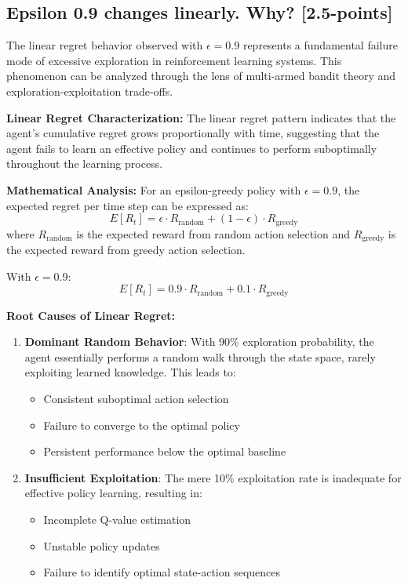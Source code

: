 \documentclass[12pt]{article}
\begin{document}
{{{\subsection{Epsilon 0.9 changes linearly. Why? [2.5-points]}

The linear regret behavior observed with $\epsilon = 0.9$ represents a fundamental failure mode of excessive exploration in reinforcement learning systems. This phenomenon can be analyzed through the lens of multi-armed bandit theory and exploration-exploitation trade-offs.

\textbf{Linear Regret Characterization:}
The linear regret pattern indicates that the agent's cumulative regret grows proportionally with time, suggesting that the agent fails to learn an effective policy and continues to perform suboptimally throughout the learning process.

\textbf{Mathematical Analysis:}
For an epsilon-greedy policy with $\epsilon = 0.9$, the expected regret per time step can be expressed as:
$$E[R_t] = \epsilon \cdot R_{\text{random}} + (1-\epsilon) \cdot R_{\text{greedy}}$$
where $R_{\text{random}}$ is the expected reward from random action selection and $R_{\text{greedy}}$ is the expected reward from greedy action selection.

With $\epsilon = 0.9$:
$$E[R_t] = 0.9 \cdot R_{\text{random}} + 0.1 \cdot R_{\text{greedy}}$$

\textbf{Root Causes of Linear Regret:}

\begin{enumerate}
    \item \textbf{Dominant Random Behavior}: With 90\% exploration probability, the agent essentially performs a random walk through the state space, rarely exploiting learned knowledge. This leads to:
    \begin{itemize}
        \item Consistent suboptimal action selection
        \item Failure to converge to the optimal policy
        \item Persistent performance below the optimal baseline
    \end{itemize}
    
    \item \textbf{Insufficient Exploitation}: The mere 10\% exploitation rate is inadequate for effective policy learning, resulting in:
    \begin{itemize}
        \item Incomplete Q-value estimation
        \item Unstable policy updates
        \item Failure to identify optimal state-action sequences
    \end{itemize}
    

\end{enumerate}}}}
\end{document}
